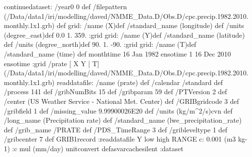 \begin{ingrid}
continuedataset:
 /year0 0 def
 /filepattern (/Data/data1/iri/modelling/daved/NMME_Data.D/Obs.D/cpc.precip.1982.2010.monthly.1x1.grb) def
grid:
/name (X)def
/standard_name (longitude) def
/units (degree_east)def
 0.0 1. 359.
:grid
grid:
/name (Y)def
/standard_name (latitude) def
/units (degree_north)def
 90. 1. -90.
:grid
grid:
/name (T)def
/standard_name (time) def
monthtime
16 Jan 1982 ensotime
1
16 Dec 2010 ensotime
:grid
 /prate{
[ X Y | T] (/Data/data1/iri/modelling/daved/NMME_Data.D/Obs.D/cpc.precip.1982.2010.monthly.1x1.grb) readdatafile:
/name (prate) def
 /calendar /standard def
 /process 141 def
 /gribNumBits 15 def
 /gribparam 59 def
 /PTVersion 2 def
 /center (US Weather Service - National Met. Center) def
 /GRIBgridcode 3 def
 /gribfield 1 def
 /missing_value 9.99900026E20 def
 /units (kg/m^2/s)cvn def
 /long_name (Precipitation rate) def
 /standard_name (lwe_precipitation_rate) def
 /grib_name /PRATE def
 /PDS_TimeRange 3 def
 /gribleveltype 1 def
 /gribcenter 7 def
 GRIB1record :readdatafile
Y low high RANGE
c: 0.001 (m3 kg-1) :c
mul (mm/day) unitconvert
}defasvarcachesilent
:dataset
\end{ingrid}
